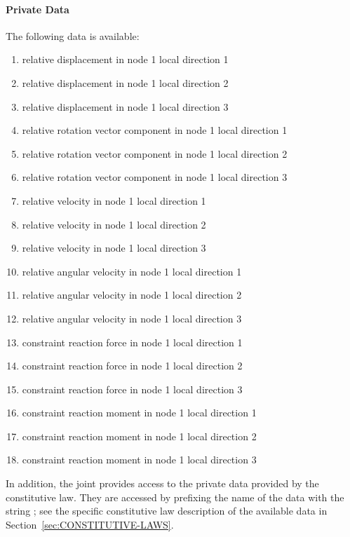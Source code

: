 \paragraph{Private Data}
The following data is available:
\begin{enumerate}
\item {} relative displacement in node 1 local direction 1
\item {} relative displacement in node 1 local direction 2
\item {} relative displacement in node 1 local direction 3
\item {} relative rotation vector component in node 1 local direction 1
\item {} relative rotation vector component in node 1 local direction 2
\item {} relative rotation vector component in node 1 local direction 3
\item {} relative velocity in node 1 local direction 1
\item {} relative velocity in node 1 local direction 2
\item {} relative velocity in node 1 local direction 3
\item {} relative angular velocity in node 1 local direction 1
\item {} relative angular velocity in node 1 local direction 2
\item {} relative angular velocity in node 1 local direction 3
\item {} constraint reaction force in node 1 local direction 1
\item {} constraint reaction force in node 1 local direction 2
\item {} constraint reaction force in node 1 local direction 3
\item {} constraint reaction moment in node 1 local direction 1
\item {} constraint reaction moment in node 1 local direction 2
\item {} constraint reaction moment in node 1 local direction 3
\end{enumerate}
In addition, the joint provides
access to the private data provided by the constitutive law.
They are accessed by prefixing the name of the data with the string
; see the specific constitutive law
description of the available data in Section~\ref{sec:CONSTITUTIVE-LAWS}.





